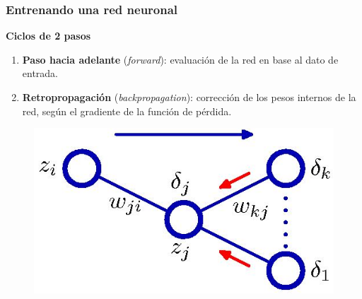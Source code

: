 \documentclass[10pt,center]{beamer}
\begin{document}
\begin{frame}
    \frametitle{Entrenando una red neuronal}
    \textbf{Ciclos de 2 pasos}
    \begin{enumerate}
      \item \textbf{Paso hacia adelante} (\textit{forward}): evaluación de la red en base al dato de entrada.
      \item \textbf{Retropropagación} (\textit{backpropagation}): corrección de los pesos internos de la red, según el gradiente de la función de pérdida.
    \end{enumerate}

    \begin{figure}[ht]
    \captionsetup[subfigure]{labelformat=empty}
      \begin{center}
      \includegraphics[width=0.5\linewidth]{./img/bishop_backpropagation.jpg}
      \end{center}
    \end{figure}
\end{frame}
\end{document}
